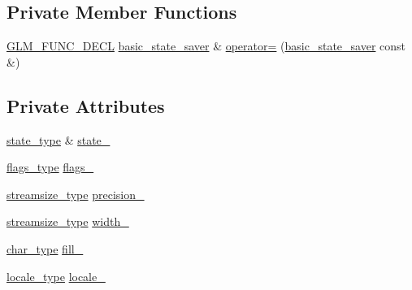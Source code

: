 \subsection*{Private Member Functions}
\begin{DoxyCompactItemize}
\item 
\mbox{\hyperlink{setup_8hpp_ab2d052de21a70539923e9bcbf6e83a51}{G\+L\+M\+\_\+\+F\+U\+N\+C\+\_\+\+D\+E\+CL}} \mbox{\hyperlink{classglm_1_1io_1_1basic__state__saver}{basic\+\_\+state\+\_\+saver}} \& \mbox{\hyperlink{classglm_1_1io_1_1basic__state__saver_add3605cf6a261400ca499be074baa4db}{operator=}} (\mbox{\hyperlink{classglm_1_1io_1_1basic__state__saver}{basic\+\_\+state\+\_\+saver}} const \&)
\end{DoxyCompactItemize}
\subsection*{Private Attributes}
\begin{DoxyCompactItemize}
\item 
\mbox{\hyperlink{classglm_1_1io_1_1basic__state__saver_a84787cc03192543bfe67ef25e7f20aa6}{state\+\_\+type}} \& \mbox{\hyperlink{classglm_1_1io_1_1basic__state__saver_a969e854089f2df42ee0050d38cc70903}{state\+\_\+}}
\item 
\mbox{\hyperlink{classglm_1_1io_1_1basic__state__saver_a73ca8320543524c7ab7f1ce97d30aff6}{flags\+\_\+type}} \mbox{\hyperlink{classglm_1_1io_1_1basic__state__saver_a2017c6e006a9e5c0c1ee191aee59c835}{flags\+\_\+}}
\item 
\mbox{\hyperlink{classglm_1_1io_1_1basic__state__saver_a0a4c44df9a4fcf7531af6da7698e0931}{streamsize\+\_\+type}} \mbox{\hyperlink{classglm_1_1io_1_1basic__state__saver_a1b442206b28b324603599175285fb55a}{precision\+\_\+}}
\item 
\mbox{\hyperlink{classglm_1_1io_1_1basic__state__saver_a0a4c44df9a4fcf7531af6da7698e0931}{streamsize\+\_\+type}} \mbox{\hyperlink{classglm_1_1io_1_1basic__state__saver_a7c2f48c587295d3717b0b6790f78034d}{width\+\_\+}}
\item 
\mbox{\hyperlink{classglm_1_1io_1_1basic__state__saver_ae6abb8e2e6bd4a044e953746691ffe8e}{char\+\_\+type}} \mbox{\hyperlink{classglm_1_1io_1_1basic__state__saver_abf8166290d087051954306facad38e00}{fill\+\_\+}}
\item 
\mbox{\hyperlink{classglm_1_1io_1_1basic__state__saver_acc657f13df9c1fd68e1014b96ff615cb}{locale\+\_\+type}} \mbox{\hyperlink{classglm_1_1io_1_1basic__state__saver_a108385f01212b427ebae048eaf181e0d}{locale\+\_\+}}
\end{DoxyCompactItemize}


